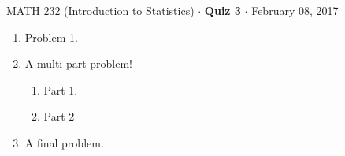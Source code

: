 \documentclass[letterpaper,10pt]{article}
\begin{document}
\pagestyle{empty}

\begin{center}MATH 232 (Introduction to Statistics) $\cdot$ \textbf{Quiz 3} $\cdot$ February 08, 2017\end{center}

\begin{enumerate}[label=\textbf{Problem \arabic*.}]

\item Problem 1. \vfill

\item A multi-part problem!
	\begin{enumerate}[label=\textbf{(\alph*)}]
	\item Part 1.\vfill
	\item Part 2\vfill
\end{enumerate}


\item A final problem.\vfill

\end{enumerate}
\end{document}
